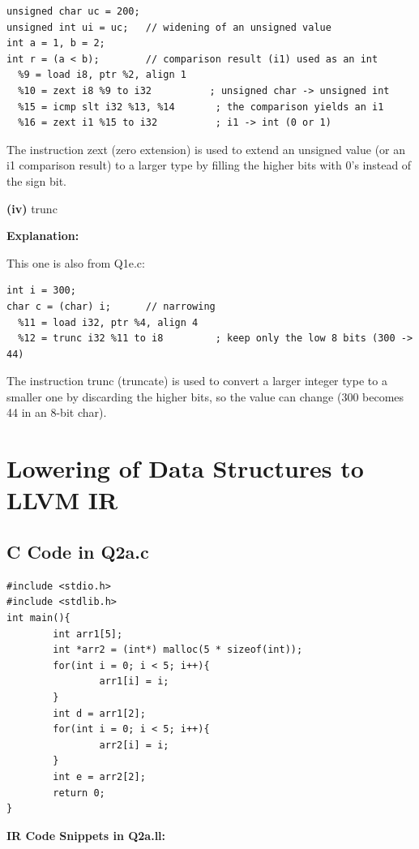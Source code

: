 \begin{lstlisting}
unsigned char uc = 200;
unsigned int ui = uc;   // widening of an unsigned value
int a = 1, b = 2;
int r = (a < b);        // comparison result (i1) used as an int
  %9 = load i8, ptr %2, align 1
  %10 = zext i8 %9 to i32          ; unsigned char -> unsigned int
  %15 = icmp slt i32 %13, %14       ; the comparison yields an i1
  %16 = zext i1 %15 to i32          ; i1 -> int (0 or 1)
\end{lstlisting}

The instruction zext (zero extension) is used to extend an unsigned value (or an i1 comparison result) to a larger type by filling the higher bits with 0's instead of the sign bit.


\textbf{(iv)} trunc


\textbf{Explanation:} 


This one is also from Q1e.c:


\begin{lstlisting}
int i = 300;
char c = (char) i;      // narrowing
  %11 = load i32, ptr %4, align 4
  %12 = trunc i32 %11 to i8         ; keep only the low 8 bits (300 -> 44)
\end{lstlisting}

The instruction trunc (truncate) is used to convert a larger integer type to a smaller one by discarding the higher bits, so the value can change (300 becomes 44 in an 8-bit char).


\section{Lowering of Data Structures to LLVM IR}

\subsection{C Code in Q2a.c}

\begin{lstlisting}
#include <stdio.h>
#include <stdlib.h>
int main(){
        int arr1[5];
        int *arr2 = (int*) malloc(5 * sizeof(int));
        for(int i = 0; i < 5; i++){
                arr1[i] = i;
        }
        int d = arr1[2];
        for(int i = 0; i < 5; i++){
                arr2[i] = i;
        }
        int e = arr2[2];
        return 0;
}
\end{lstlisting}

\medskip\noindent\textbf{IR Code Snippets in Q2a.ll:}\par


